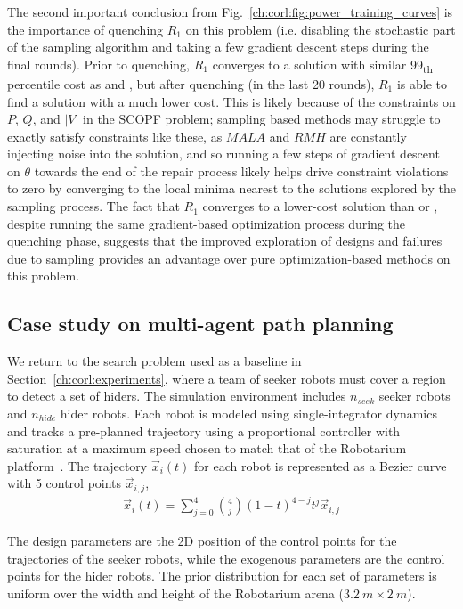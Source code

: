 The second important conclusion from Fig.~\ref{ch:corl:fig:power_training_curves} is the importance of quenching $R_1$ on this problem (i.e. disabling the stochastic part of the sampling algorithm and taking a few gradient descent steps during the final rounds). Prior to quenching, $R_1$ converges to a solution with similar 99\textsubscript{th} percentile cost as \gdr{} and \gda{}, but after quenching (in the last 20 rounds), $R_1$ is able to find a solution with a much lower cost. This is likely because of the constraints on $P$, $Q$, and $|V|$ in the SCOPF problem; sampling based methods may struggle to exactly satisfy constraints like these, as $MALA$ and $RMH$ are constantly injecting noise into the solution, and so running a few steps of gradient descent on $\theta$ towards the end of the repair process likely helps drive constraint violations to zero by converging to the local minima nearest to the solutions explored by the sampling process. The fact that $R_1$ converges to a lower-cost solution than \gdr{} or \gda{}, despite running the same gradient-based optimization process during the quenching phase, suggests that the improved exploration of designs and failures due to sampling provides an advantage over pure optimization-based methods on this problem.

\subsection{Case study on multi-agent path planning}

We return to the search problem used as a baseline in Section~\ref{ch:corl:experiments}, where a team of seeker robots must cover a region to detect a set of hiders. The simulation environment includes $n_{seek}$ seeker robots and $n_{hide}$ hider robots. Each robot is modeled using single-integrator dynamics and tracks a pre-planned trajectory using a proportional controller with saturation at a maximum speed chosen to match that of the Robotarium platform~\cite{wilsonRobotariumGloballyImpactful2020}. The trajectory $\vec{x}_i(t)$ for each robot is represented as a Bezier curve with 5 control points $\vec{x}_{i, j}$,
\begin{align*}
    \vec{x}_i(t) = \sum_{j=0}^4 \binom{4}{j}(1-t)^{4-j}t^j \vec{x}_{i, j}
\end{align*}

The design parameters are the 2D position of the control points for the trajectories of the seeker robots, while the exogenous parameters are the control points for the hider robots. The prior distribution for each set of parameters is uniform over the width and height of the Robotarium arena ($\SI{3.2}{m}\times\SI{2}{m}$).

